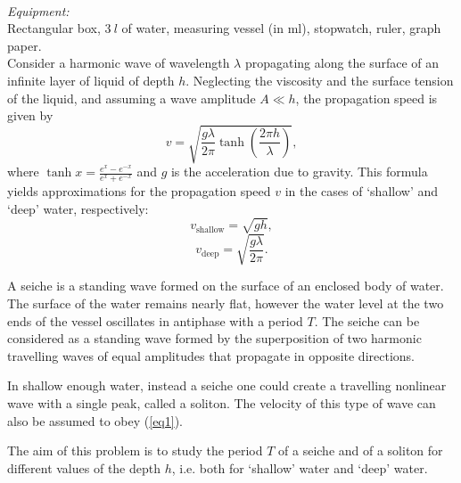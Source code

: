 \documentclass[../TST.tex]{subfiles}
\begin{document}
\begin{eproblem}[Seiche]{\ \\[5pt]}
\textit{Equipment:}\\
Rectangular box, $\qty{3}{l}$ of water, measuring vessel (in ml), stopwatch, ruler, graph paper.\\

Consider a harmonic wave of wavelength $\lambda$ propagating along the surface of an infinite layer of liquid of depth $h$. Neglecting the viscosity and the surface tension of the liquid, and assuming a wave amplitude $A\ll h$, the propagation speed is given by
\begin{equation}
	v=\sqrt{\frac{g\lambda}{2\pi}\tanh{\left(\frac{2\pi h}{\lambda}\right)}}
,
\label{eq1}
\end{equation}
where $\tanh{x}=\frac{e^x-e^{-x}}{e^x+e^{-x}}$ and $g$ is the acceleration due to gravity. This formula yields approximations for the propagation speed $v$ in the cases of `shallow' and `deep' water, respectively:
\begin{equation}
	v_\mathrm{shallow}=\sqrt{gh}
,
\end{equation}
\begin{equation}
	v_\mathrm{deep}=\sqrt{\frac{g\lambda}{2\pi}}
.
\end{equation}

\setlength{\parindent}{3ex}

A seiche is a standing wave formed on the surface of an enclosed body of water. The surface of the water remains nearly flat, however the water level at the two ends of the vessel oscillates in antiphase with a period $T$. The seiche can be considered as a standing wave formed by the superposition of two harmonic travelling waves of equal amplitudes that propagate in opposite directions. 

In shallow enough water, instead a seiche one could create a travelling nonlinear wave with a single peak, called a soliton. The velocity of this type of wave can also be assumed to obey  (\ref{eq1}).

The aim of this problem is to study the period $T$ of a seiche and of a soliton for different values of the depth $h$, i.e. both for `shallow' water and `deep' water. 


\end{eproblem}
\end{document}
